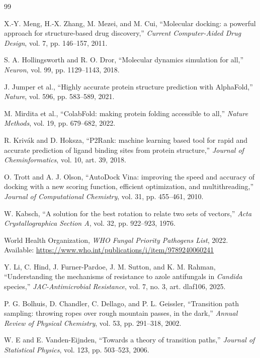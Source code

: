 \documentclass[11pt]{article}
\begin{document}
\clearpage
\begin{thebibliography}{99}

X.-Y. Meng, H.-X. Zhang, M. Mezei, and M. Cui,
``Molecular docking: a powerful approach for structure-based drug discovery,''
\emph{Current Computer-Aided Drug Design}, vol. 7, pp. 146--157, 2011.

S. A. Hollingsworth and R. O. Dror,
``Molecular dynamics simulation for all,''
\emph{Neuron}, vol. 99, pp. 1129--1143, 2018.

J. Jumper et al.,
``Highly accurate protein structure prediction with AlphaFold,''
\emph{Nature}, vol. 596, pp. 583--589, 2021.

M. Mirdita et al.,
``ColabFold: making protein folding accessible to all,''
\emph{Nature Methods}, vol. 19, pp. 679--682, 2022.

R. Kriv\'{a}k and D. Hoksza,
``P2Rank: machine learning based tool for rapid and accurate prediction of ligand binding sites from protein structure,''
\emph{Journal of Cheminformatics}, vol. 10, art. 39, 2018.

O. Trott and A. J. Olson,
``AutoDock Vina: improving the speed and accuracy of docking with a new scoring function, efficient optimization, and multithreading,''
\emph{Journal of Computational Chemistry}, vol. 31, pp. 455--461, 2010.

W. Kabsch,
``A solution for the best rotation to relate two sets of vectors,''
\emph{Acta Crystallographica Section A}, vol. 32, pp. 922--923, 1976.

World Health Organization,
\emph{WHO Fungal Priority Pathogens List}, 2022.
Available: \url{https://www.who.int/publications/i/item/9789240060241}

Y. Li, C. Hind, J. Furner-Pardoe, J. M. Sutton, and K. M. Rahman,
``Understanding the mechanisms of resistance to azole antifungals in \emph{Candida} species,''
\emph{JAC-Antimicrobial Resistance}, vol. 7, no. 3, art. dlaf106, 2025.

P. G. Bolhuis, D. Chandler, C. Dellago, and P. L. Geissler,
``Transition path sampling: throwing ropes over rough mountain passes, in the dark,''
\emph{Annual Review of Physical Chemistry}, vol. 53, pp. 291--318, 2002.

W. E and E. Vanden-Eijnden,
``Towards a theory of transition paths,''
\emph{Journal of Statistical Physics}, vol. 123, pp. 503--523, 2006.


\end{thebibliography}
\end{document}
